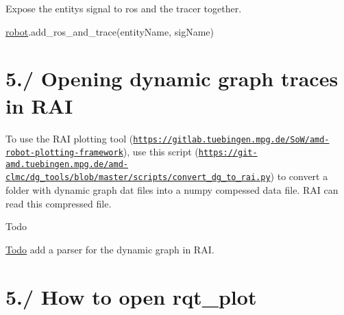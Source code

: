 Expose the entity\textquotesingle{}s signal to ros and the tracer together. 
\begin{DoxyCode}
\hyperlink{namespacerobot}{robot}.add\_ros\_and\_trace(entityName, sigName)
\end{DoxyCode}
\hypertarget{subpage_plot_plot_sec_add_rai}{}\section{5./ Opening dynamic graph traces in R\+AI}\label{subpage_plot_plot_sec_add_rai}
To use the R\+AI plotting tool (\href{https://gitlab.tuebingen.mpg.de/SoW/amd-robot-plotting-framework}{\tt https\+://gitlab.\+tuebingen.\+mpg.\+de/\+So\+W/amd-\/robot-\/plotting-\/framework}), use this script (\href{https://git-amd.tuebingen.mpg.de/amd-clmc/dg_tools/blob/master/scripts/convert_dg_to_rai.py}{\tt https\+://git-\/amd.\+tuebingen.\+mpg.\+de/amd-\/clmc/dg\+\_\+tools/blob/master/scripts/convert\+\_\+dg\+\_\+to\+\_\+rai.\+py}) to convert a folder with dynamic graph dat files into a numpy compessed data file. R\+AI can read this compressed file. \begin{DoxyRefDesc}{Todo}
\item[\hyperlink{todo__todo000003}{Todo}]add a parser for the dynamic graph in R\+AI.\end{DoxyRefDesc}
\hypertarget{subpage_plot_plot_sec_add_rqt_plot}{}\section{5./ How to open rqt\+\_\+plot}\label{subpage_plot_plot_sec_add_rqt_plot}

